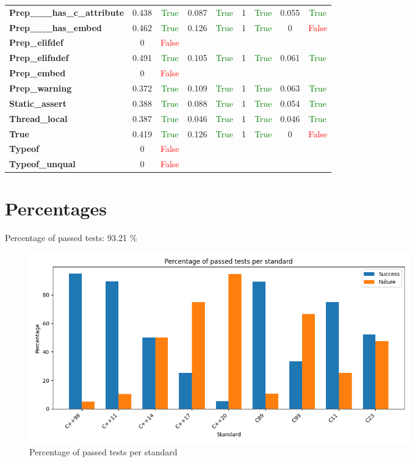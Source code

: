 \documentclass{article}
\begin{document}
\begin{xltabular}{\textwidth}{lcccccccc}
\textbf{{\fontsize{10}{12}\selectfont Prep\_\_\_has\_c\_attribute}}& 0.438&\textcolor{green}{True}& 0.087&\textcolor{green}{True}& 1&\textcolor{green}{True}& 0.055&\textcolor{green}{True} \\[0.5ex]
\textbf{{\fontsize{10}{12}\selectfont Prep\_\_\_has\_embed}}& 0.462&\textcolor{green}{True}& 0.126&\textcolor{green}{True}& 1&\textcolor{green}{True}& 0&\textcolor{red}{False} \\[0.5ex]
\textbf{{\fontsize{10}{12}\selectfont Prep\_elifdef}}& 0&\textcolor{red}{False} \\[0.5ex]
\textbf{{\fontsize{10}{12}\selectfont Prep\_elifndef}}& 0.491&\textcolor{green}{True}& 0.105&\textcolor{green}{True}& 1&\textcolor{green}{True}& 0.061&\textcolor{green}{True} \\[0.5ex]
\textbf{{\fontsize{10}{12}\selectfont Prep\_embed}}& 0&\textcolor{red}{False} \\[0.5ex]
\textbf{{\fontsize{10}{12}\selectfont Prep\_warning}}& 0.372&\textcolor{green}{True}& 0.109&\textcolor{green}{True}& 1&\textcolor{green}{True}& 0.063&\textcolor{green}{True} \\[0.5ex]
\textbf{{\fontsize{10}{12}\selectfont Static\_assert}}& 0.388&\textcolor{green}{True}& 0.088&\textcolor{green}{True}& 1&\textcolor{green}{True}& 0.054&\textcolor{green}{True} \\[0.5ex]
\textbf{{\fontsize{10}{12}\selectfont Thread\_local}}& 0.387&\textcolor{green}{True}& 0.046&\textcolor{green}{True}& 1&\textcolor{green}{True}& 0.046&\textcolor{green}{True} \\[0.5ex]
\textbf{{\fontsize{10}{12}\selectfont True}}& 0.419&\textcolor{green}{True}& 0.126&\textcolor{green}{True}& 1&\textcolor{green}{True}& 0&\textcolor{red}{False} \\[0.5ex]
\textbf{{\fontsize{10}{12}\selectfont Typeof}}& 0&\textcolor{red}{False} \\[0.5ex]
\textbf{{\fontsize{10}{12}\selectfont Typeof\_unqual}}& 0&\textcolor{red}{False} \\[0.5ex]
\bottomrule
\end{xltabular}
\newpage
\section{Percentages}Percentage of passed tests:
93.21 \%\begin{figure}[h!]
\centering
\includegraphics[width=0.8\textwidth]{global_percentage.png}
\caption{Percentage of passed tests per standard}
\label{fig:global_percentage}
\end{figure}
\end{document}
